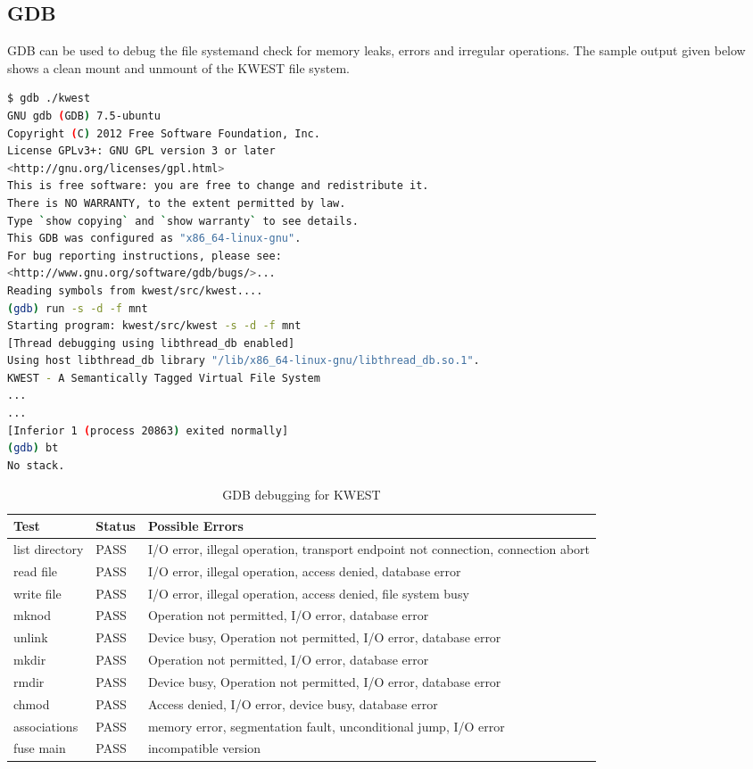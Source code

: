 \subsection*{GDB}
GDB can be used to debug the file systemand check for memory leaks, errors and irregular operations. The sample output given below shows a clean mount and unmount of the KWEST file system.
\begin{lstlisting}[language=bash,frame=single]
$ gdb ./kwest
GNU gdb (GDB) 7.5-ubuntu
Copyright (C) 2012 Free Software Foundation, Inc.
License GPLv3+: GNU GPL version 3 or later 
<http://gnu.org/licenses/gpl.html>
This is free software: you are free to change and redistribute it.
There is NO WARRANTY, to the extent permitted by law.  
Type `show copying` and `show warranty` to see details.
This GDB was configured as "x86_64-linux-gnu".
For bug reporting instructions, please see:
<http://www.gnu.org/software/gdb/bugs/>...
Reading symbols from kwest/src/kwest....
(gdb) run -s -d -f mnt
Starting program: kwest/src/kwest -s -d -f mnt
[Thread debugging using libthread_db enabled]
Using host libthread_db library "/lib/x86_64-linux-gnu/libthread_db.so.1".
KWEST - A Semantically Tagged Virtual File System
...
...
[Inferior 1 (process 20863) exited normally]
(gdb) bt
No stack.
\end{lstlisting}

\begin{table}[h]
\begin{tabular}{|p{3cm}|p{2cm}|p{8cm}|}
\hline
\textbf{Test} & \textbf{Status} & \textbf{Possible Errors} \\ \hline
list directory	&	PASS &  I/O error, illegal operation, transport endpoint not connection, connection abort \\ \hline
read file & PASS & I/O error, illegal operation, access denied, database error \\ \hline
write file & PASS & I/O error, illegal operation, access denied, file system busy \\ \hline
mknod & PASS & Operation not permitted, I/O error, database error \\ \hline
unlink & PASS & Device busy, Operation not permitted, I/O error, database error \\ \hline
mkdir & PASS & Operation not permitted, I/O error, database error \\ \hline
rmdir & PASS & Device busy, Operation not permitted, I/O error, database error \\ \hline
chmod & PASS & Access denied, I/O error, device busy, database error \\ \hline
associations & PASS & memory error, segmentation fault, unconditional jump, I/O error \\ \hline
fuse main & PASS & incompatible version \\
\hline
\end{tabular}
\caption{GDB debugging for KWEST}
\label{tab:GDB}
\end{table}
